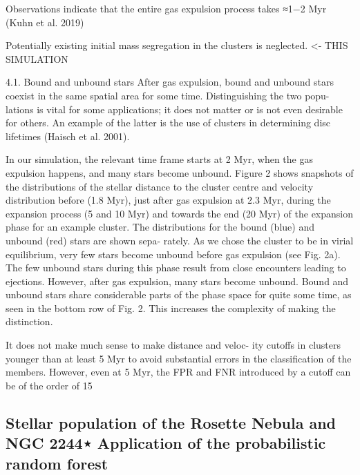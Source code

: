 \documentclass[../main.tex]{subfiles}
\begin{document}
{Observations indicate that the entire gas expulsion process
takes ≈1−2 Myr (Kuhn et al. 2019)

Potentially existing initial mass segregation in
the clusters is neglected. <- THIS SIMULATION

4.1. Bound and unbound stars
After gas expulsion, bound and unbound stars coexist in the
same spatial area for some time. Distinguishing the two popu-
lations is vital for some applications; it does not matter or is not
even desirable for others. An example of the latter is the use of
clusters in determining disc lifetimes (Haisch et al. 2001).

In our simulation, the relevant time frame starts at 2 Myr,
when the gas expulsion happens, and many stars become
unbound. Figure 2 shows snapshots of the distributions of the
stellar distance to the cluster centre and velocity distribution
before (1.8 Myr), just after gas expulsion at 2.3 Myr, during the
expansion process (5 and 10 Myr) and towards the end (20 Myr)
of the expansion phase for an example cluster. The distributions
for the bound (blue) and unbound (red) stars are shown sepa-
rately. As we chose the cluster to be in virial equilibrium, very
few stars become unbound before gas expulsion (see Fig. 2a).
The few unbound stars during this phase result from close
encounters leading to ejections. However, after gas expulsion,
many stars become unbound. Bound and unbound stars share
considerable parts of the phase space for quite some time, as
seen in the bottom row of Fig. 2. This increases the complexity
of making the distinction.

It does not make much sense to make distance and veloc-
ity cutoﬀs in clusters younger than at least 5 Myr to avoid
substantial errors in the classification of the members. However,
even at 5 Myr, the FPR and FNR introduced by a cutoﬀ can be of
the order of 15%


\subsection{Stellar population of the Rosette Nebula and NGC 2244⋆
	Application of the probabilistic random forest}



}
\end{document}
